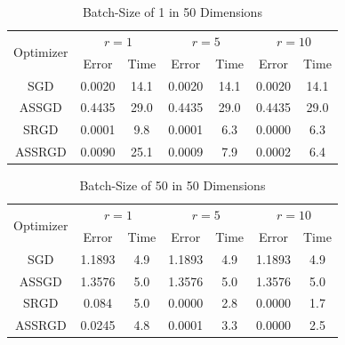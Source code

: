 \documentclass[conference,compsoc]{IEEEtran}
\begin{document}
\begin{table}[!t]
\renewcommand{\arraystretch}{1.3}
\caption{Batch-Size of 1 in 50 Dimensions}
\label{tab:d50mb1}
\centering
\begin{tabular}{|c||c|c|c|c|c|c|}
\hline
\multirow{2}{*}{Optimizer} &
    \multicolumn{2}{c}{$r = 1$} &
    \multicolumn{2}{c}{$r = 5$} &
    \multicolumn{2}{c|}{$r = 10$}\\
    & Error & Time & Error & Time & Error & Time \\
    \hline
    SGD & 0.0020 & 14.1 & 0.0020 & 14.1 & 0.0020 & 14.1\\
    \hline
    ASSGD & 0.4435 & 29.0 & 0.4435 & 29.0 & 0.4435 & 29.0\\ 
    \hline
    SRGD & 0.0001 & 9.8 & 0.0001 & 6.3 & 0.0000 & 6.3\\
    \hline
    ASSRGD & 0.0090 & 25.1 & 0.0009 & 7.9 & 0.0002 & 6.4\\
\hline
\end{tabular}
\end{table}

\begin{table}[!t]
\renewcommand{\arraystretch}{1.3}
\caption{Batch-Size of 50 in 50 Dimensions}
\label{tab:d50mb50}
\centering
\begin{tabular}{|c||c|c|c|c|c|c|}
\hline
\multirow{2}{*}{Optimizer} &
    \multicolumn{2}{c}{$r = 1$} &
    \multicolumn{2}{c}{$r = 5$} &
    \multicolumn{2}{c|}{$r = 10$}\\
    & Error & Time & Error & Time & Error & Time \\
    \hline
    SGD & 1.1893 & 4.9 & 1.1893 & 4.9 & 1.1893 & 4.9\\ 
    \hline
    ASSGD & 1.3576 & 5.0 & 1.3576 & 5.0 & 1.3576 & 5.0\\ 
    \hline
    SRGD & 0.084 & 5.0  & 0.0000 & 2.8 & 0.0000 & 1.7\\
    \hline
    ASSRGD & 0.0245 & 4.8 & 0.0001 & 3.3 & 0.0000 & 2.5\\
\hline
\end{tabular}
\end{table}
\end{document}
